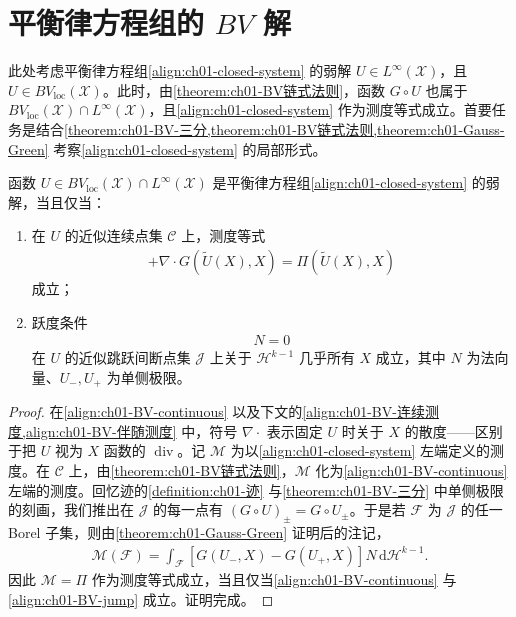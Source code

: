 \documentclass[../../main.tex]{subfiles}
\begin{document}
\section{平衡律方程组的 $BV$ 解}\label{section:ch01-BV解}

此处考虑平衡律方程组\cref{align:ch01-closed-system} 的弱解 $U\in L^{\infty}(\mathscr{X})$，且 $U\in BV_{\mathrm{loc}}(\mathscr{X})$。此时，由\cref{theorem:ch01-BV链式法则}，函数 $G\circ U$ 也属于 $BV_{\mathrm{loc}}(\mathscr{X})\cap L^{\infty}(\mathscr{X})$，且\cref{align:ch01-closed-system} 作为测度等式成立。首要任务是结合\cref{theorem:ch01-BV-三分,theorem:ch01-BV链式法则,theorem:ch01-Gauss-Green} 考察\cref{align:ch01-closed-system} 的局部形式。

\begin{theorem}\label{theorem:ch01-BV解刻画}
函数 $U\in BV_{\mathrm{loc}}(\mathscr{X})\cap L^{\infty}(\mathscr{X})$ 是平衡律方程组\cref{align:ch01-closed-system} 的弱解，当且仅当：
\begin{enumerate}
\item\label{item:ch01-BV解刻画-a} 在 $U$ 的近似连续点集 $\mathscr{C}$ 上，测度等式
\begin{align}
[\mathsf{D}G(\tilde{U}(X),X),\operatorname{grad}U(X)]+\nabla\cdot G(\tilde{U}(X),X)=\Pi(\tilde{U}(X),X)\label{align:ch01-BV-continuous}
\end{align}
成立；
\item\label{item:ch01-BV解刻画-b} 跃度条件
\begin{align}
[G(U_{+},X)-G(U_{-},X)]N=0\label{align:ch01-BV-jump}
\end{align}
在 $U$ 的近似跳跃间断点集 $\mathscr{J}$ 上关于 $\mathscr{H}^{k-1}$ 几乎所有 $X$ 成立，其中 $N$ 为法向量、$U_{-},U_{+}$ 为单侧极限。
\end{enumerate}
\end{theorem}

\begin{proof}
在\cref{align:ch01-BV-continuous} 以及下文的\cref{align:ch01-BV-连续测度,align:ch01-BV-伴随测度} 中，符号 $\nabla\cdot$ 表示固定 $U$ 时关于 $X$ 的散度——区别于把 $U$ 视为 $X$ 函数的 $\operatorname{div}$。记 $\mathscr{M}$ 为以\cref{align:ch01-closed-system} 左端定义的测度。在 $\mathscr{C}$ 上，由\cref{theorem:ch01-BV链式法则}，$\mathscr{M}$ 化为\cref{align:ch01-BV-continuous} 左端的测度。回忆迹的\cref{definition:ch01-迹} 与\cref{theorem:ch01-BV-三分} 中单侧极限的刻画，我们推出在 $\mathscr{J}$ 的每一点有 $(G\circ U)_{\pm}=G\circ U_{\pm}$。于是若 $\mathscr{F}$ 为 $\mathscr{J}$ 的任一 Borel 子集，则由\cref{theorem:ch01-Gauss-Green} 证明后的注记，
\begin{align}
\mathscr{M}(\mathscr{F})=\int_{\mathscr{F}}[G(U_{-},X)-G(U_{+},X)]N\,\mathrm{d}\mathscr{H}^{k-1}.\label{align:ch01-BV-跳测度}
\end{align}
因此 $\mathscr{M}=\Pi$ 作为测度等式成立，当且仅当\cref{align:ch01-BV-continuous} 与\cref{align:ch01-BV-jump} 成立。证明完成。
\end{proof}
\end{document}
